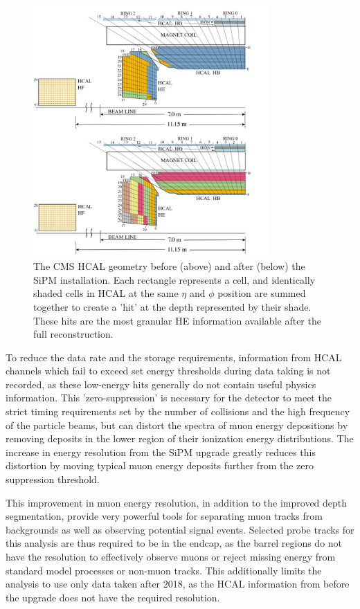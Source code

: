 \begin{figure}[!htpb]
	   \centering
	      \includegraphics[width=0.8\textwidth]{figures/HE_upgrade.pdf}
		 \caption[The 2018 HE upgrade]{The CMS HCAL geometry before (above) and after (below) the SiPM installation. Each rectangle represents a cell, and identically shaded cells in HCAL at the same $\eta$ and $\phi$ position are summed together to create a 'hit' at the depth represented by their shade. These hits are the most granular HE information available after the full reconstruction.}
	    \label{fig:HElayout}
\end{figure}

To reduce the data rate and the storage requirements, information from HCAL channels which fail to exceed set energy thresholds during data taking is not recorded, as these low-energy hits generally do not contain useful physics information. 
This 'zero-suppression' is necessary for the detector to meet the strict timing requirements set by the number of collisions and the high frequency of the particle beams, but can distort the spectra of muon energy depositions by removing deposits in the lower region of their ionization energy distributions.
The increase in energy resolution from the SiPM upgrade greatly reduces this distortion by moving typical muon energy deposits further from the zero suppression threshold.
 
This improvement in muon energy resolution, in addition to the improved depth segmentation, provide very powerful tools for separating muon tracks from backgrounds as well as observing potential signal events.
Selected probe tracks for this analysis are thus required to be in the endcap, as the barrel regions do not have the resolution to effectively observe muons or reject missing energy from standard model processes or non-muon tracks.
This additionally limits the analysis to use only data taken after 2018, as the HCAL information from before the upgrade does not have the required resolution.

